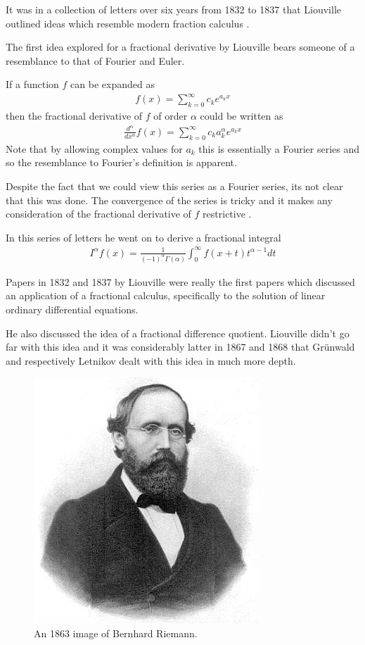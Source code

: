 It was in a collection of letters over six years from 1832 to 1837 that Liouville outlined ideas which resemble modern fraction calculus \cite{Samko1993}. 

The first idea explored for a fractional derivative by Liouville bears someone of a resemblance to that of Fourier and Euler. 

If a function $ f $ can be expanded as 
\begin{align}
	f(x) = \sum_{k=0}^\infty c_k e^{a_kx}
\end{align}
then the fractional derivative of $ f $ of order $ \alpha $ could be written as
\begin{align}
	\frac{d^\alpha}{dx^\alpha} f(x) = \sum_{k=0}^\infty c_k a_k^\alpha e^{a_k x}
\end{align}
Note that by allowing complex values for $ a_k $ this is essentially a Fourier series and so the resemblance to Fourier's definition is apparent.

Despite the fact that we could view this series as a Fourier series, its not clear that this was done. The convergence of the series is tricky and it makes any consideration of the fractional derivative of $ f $ restrictive \cite{Samko1993}.

In this series of letters he went on to derive a fractional integral
\begin{align}
	I^\alpha f(x) = \frac{1}{(-1)^\alpha \Gamma(\alpha)} \int_0^\infty f(x + t)t^{\alpha - 1} dt
\end{align}

Papers in 1832 and 1837 by Liouville were really the first papers which discussed an application of a fractional calculus, specifically to the solution of linear ordinary differential equations. 

He also discussed the idea of a fractional difference quotient.
Liouville didn't go far with this idea and it was considerably latter in 1867 and 1868 that Gr{\"u}nwald and respectively Letnikov dealt with this idea in much more depth. 
 
\begin{figure}
    \includegraphics[scale=0.6]{images/Georg_Friedrich_Bernhard_Riemann}
    \caption{An 1863 image of Bernhard Riemann.}
\end{figure}

